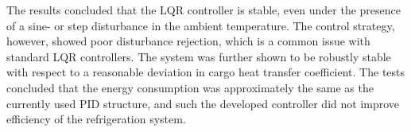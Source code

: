 

The results concluded that the LQR controller is stable, even under the presence of a sine- or step disturbance in the ambient temperature. The control strategy, however, showed poor disturbance rejection, which is a common issue with standard LQR controllers. The system was further shown to be robustly stable with respect to a reasonable deviation in cargo heat transfer coefficient. The tests concluded that the energy consumption was approximately the same as the currently used PID structure, and such the developed controller did not improve efficiency of the refrigeration system.\\


















